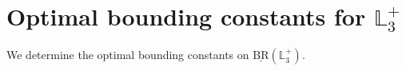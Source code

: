 \documentclass{amsart}
\theoremstyle{definition}
\newtheorem{lemma}[theorem]{Lemma}
\theoremstyle{remark}
\def\RR{\mathbb{R}}
\def\L{\mathbb{L}}
\def\BR{\mathrm{BR}}
\begin{document}
\section{Optimal bounding constants for $\L_3^+$}

We determine the optimal bounding constants on $\underline{\BR}(\L_3^+)$.
%



\end{document}
